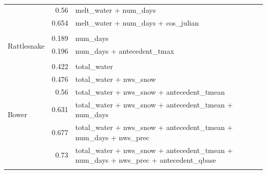 \documentclass[10pt]{article}
\begin{document}
\begin{table}[h]
\begin{center}
\begin{tabular}{lrl}
 & 0.56 & melt\_water + num\_days\\ 
 & 0.654 & melt\_water + num\_days + cos\_julian\\ 
\vspace{2mm}\\ \multirow{3}{*}{Rattlesnake} & 0.189 & num\_days\\ 
 & 0.196 & num\_days + antecedent\_tmax\\ 
\vspace{2mm}\\ \multirow{7}{*}{Bower} & 0.422 & total\_water\\ 
 & 0.476 & total\_water + nws\_snow\\ 
 & 0.56 & total\_water + nws\_snow + antecedent\_tmean\\ 
 & 0.631 & total\_water + nws\_snow + antecedent\_tmean + num\_days\\ 
 & 0.677 & total\_water + nws\_snow + antecedent\_tmean + num\_days + nws\_prec\\ 
 & 0.73 & total\_water + nws\_snow + antecedent\_tmean + num\_days + nws\_prec + antecedent\_qbase\\ 
\vspace{2mm}\\     \end{tabular}
    \caption{\label{sed_r_square_nosnow}}
    \end{center}
\end{table}
\end{document}
